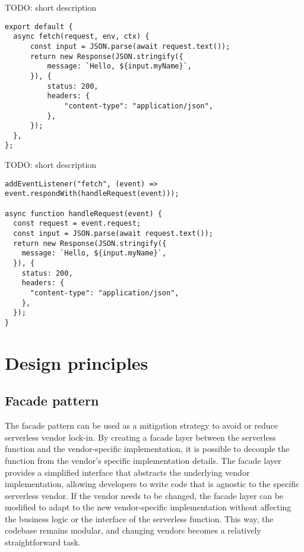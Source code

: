 TODO: short description

\begin{lstlisting}[frame=lines, style=ES6, caption={Basic Cloudflare Workers}, showstringspaces=false, captionpos=b,]
export default {
  async fetch(request, env, ctx) {
      const input = JSON.parse(await request.text());
      return new Response(JSON.stringify({
          message: `Hello, ${input.myName}`,
      }), {
          status: 200,
          headers: {
              "content-type": "application/json",
          },
      });
  },
};
\end{lstlisting}

TODO: short description

\begin{lstlisting}[frame=lines, style=ES6, caption={Basic Fastly Compute@Edge}, showstringspaces=false, captionpos=b,]
addEventListener("fetch", (event) => event.respondWith(handleRequest(event)));

async function handleRequest(event) {
  const request = event.request;
  const input = JSON.parse(await request.text());
  return new Response(JSON.stringify({
    message: `Hello, ${input.myName}`,
  }), { 
    status: 200,
    headers: {
      "content-type": "application/json",
    },
  });
}
\end{lstlisting}

\section{Design principles}
\subsection{Facade pattern}
The \gls{facade} pattern can be used as a mitigation strategy to avoid or reduce \gls{serverless} vendor lock-in. By creating a facade layer between the serverless function and the vendor-specific implementation, it is possible to decouple the function from the vendor's specific implementation details.
The facade layer provides a simplified interface that abstracts the underlying vendor implementation, allowing developers to write code that is agnostic to the specific \gls{serverless} vendor. If the vendor needs to be changed, the facade layer can be modified to adapt to the new vendor-specific implementation without affecting the business logic or the interface of the serverless function. This way, the codebase remains modular, and changing vendors becomes a relatively straightforward task.

